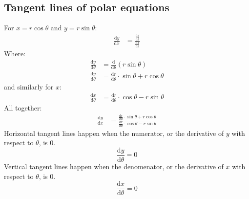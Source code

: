 \documentclass{report}
\begin{document}
    \subsection{Tangent lines of polar equations}
        For \(x = r \cos \theta\) and \(y = r \sin \theta\):
        \begin{align*}
            \frac{\mathrm{d}y}{\mathrm{d}x} &= \frac{\frac{\mathrm{d}y}{\mathrm{d}\theta}}{\frac{\mathrm{d}x}{\mathrm{d}\theta}}
        \end{align*}
        Where:
        \begin{align*}
            \frac{\mathrm{d}y}{\mathrm{d}\theta} &= \frac{\mathrm{d}}{\mathrm{d}\theta} (r \sin \theta) \\
            \frac{\mathrm{d}y}{\mathrm{d}\theta} &= \frac{\mathrm{d}r}{\mathrm{d}\theta} \cdot \sin \theta + r \cos \theta
        \end{align*}
        and similarly for \(x\):
        \begin{align*}
            \frac{\mathrm{d}x}{\mathrm{d}\theta} &= \frac{\mathrm{d}r}{\mathrm{d}\theta} \cdot \cos \theta - r \sin \theta
        \end{align*} 
        All together:
        \begin{align*}
            \frac{\mathrm{d}y}{\mathrm{d}x} &= \frac{\frac{\mathrm{d}r}{\mathrm{d}\theta} \cdot \sin \theta + r \cos \theta}{\frac{\mathrm{d}r}{\mathrm{d}\theta} \cdot \cos \theta - r \sin \theta}
        \end{align*}
        Horizontal tangent lines happen when the numerator, or the derivative of \(y\) with respect to \(\theta\), is 0.
        \[\frac{\mathrm{d}y}{\mathrm{d}\theta} = 0\]
        Vertical tangent lines happen when the denomenator, or the derivative of \(x\) with respect to \(\theta\), is 0.
        \[\frac{\mathrm{d}x}{\mathrm{d}\theta} = 0\]
    
\end{document}
